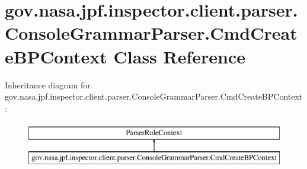 \hypertarget{classgov_1_1nasa_1_1jpf_1_1inspector_1_1client_1_1parser_1_1_console_grammar_parser_1_1_cmd_create_b_p_context}{}\section{gov.\+nasa.\+jpf.\+inspector.\+client.\+parser.\+Console\+Grammar\+Parser.\+Cmd\+Create\+B\+P\+Context Class Reference}
\label{classgov_1_1nasa_1_1jpf_1_1inspector_1_1client_1_1parser_1_1_console_grammar_parser_1_1_cmd_create_b_p_context}
Inheritance diagram for gov.\+nasa.\+jpf.\+inspector.\+client.\+parser.\+Console\+Grammar\+Parser.\+Cmd\+Create\+B\+P\+Context\+:\begin{figure}[H]
\begin{center}
\leavevmode
\includegraphics[height=2.000000cm]{classgov_1_1nasa_1_1jpf_1_1inspector_1_1client_1_1parser_1_1_console_grammar_parser_1_1_cmd_create_b_p_context}
\end{center}
\end{figure}
